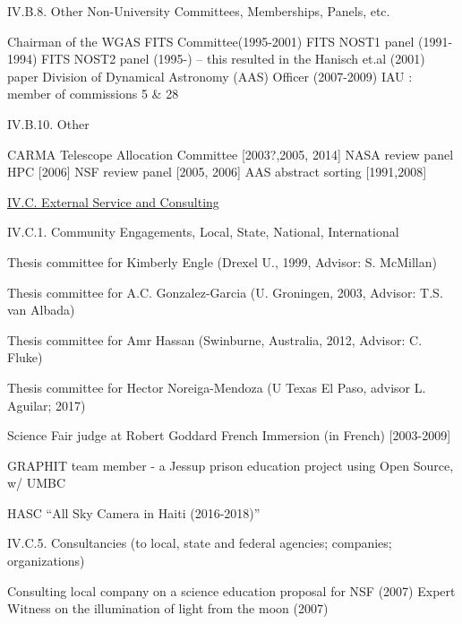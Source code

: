 \documentclass[11pt,letterpaper]{article}
\newcommand{\newi}{\newline\indent}
\begin{document}
IV.B.8. Other Non-University Committees, Memberships, Panels, etc.

Chairman of the WGAS FITS Committee(1995-2001)\newi
FITS NOST1 panel (1991-1994) \newi
FITS NOST2 panel (1995-) -- this resulted in the Hanisch et.al (2001) paper\newi
Division of Dynamical Astronomy (AAS) Officer (2007-2009)\newi
IAU : member of commissions 5 \& 28\newi


IV.B.10. Other

CARMA Telescope Allocation Committee [2003?,2005, 2014]\newi
NASA review panel HPC [2006]\newi
NSF review panel  [2005, 2006]\newi
AAS abstract sorting [1991,2008]\newi


\underline{IV.C. External Service and Consulting}

IV.C.1. Community Engagements, Local, State, National, International

Thesis committee for Kimberly Engle (Drexel U., 1999, Advisor: S. McMillan)

Thesis committee for  A.C. Gonzalez-Garcia (U. Groningen, 2003, Advisor: T.S. van Albada) 

Thesis committee for Amr Hassan (Swinburne, Australia, 2012, Advisor: C. Fluke)

Thesis committee for Hector Noreiga-Mendoza (U Texas El Paso, advisor L. Aguilar; 2017)

Science Fair judge at Robert Goddard French Immersion (in French) [2003-2009]

GRAPHIT team member - a Jessup prison  education project using Open Source, w/ UMBC

HASC ``All Sky Camera in Haiti (2016-2018)''





IV.C.5. Consultancies (to local, state and federal agencies; companies; organizations)

Consulting local company on a science education proposal for NSF (2007)\newi
Expert Witness on the illumination of light from the moon (2007)\newi
                



\end{document}
